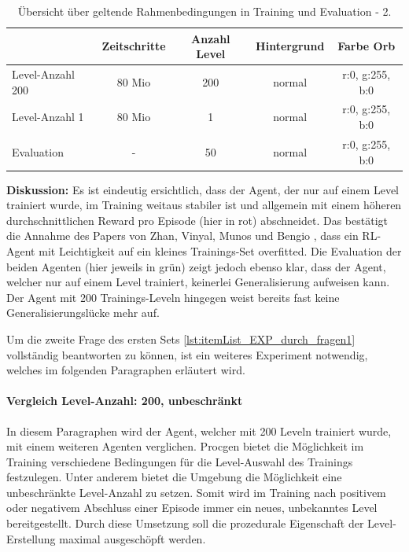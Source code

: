 \begin{center}
 \begin{table}[htb!]
 \begin{center}
  \begin{tabular}{ l c c c c }
    \hline
			       	& Zeitschritte 	& Anzahl Level 	& Hintergrund 	& Farbe Orb \\ \hline \hline
     Level-Anzahl 200 	& 80 Mio       	& 200		& 	    normal 	& r:0, g:255, b:0 \\ \hline
     Level-Anzahl 1     	& 80 Mio       	& 1			& 	    normal 	& r:0, g:255, b:0 \\ \hline
     Evaluation 		& - 	           	& 50			& 	    normal 	& r:0, g:255, b:0 \\ \hline
    \hline
  \end{tabular}
  \caption{Übersicht über geltende Rahmenbedingungen in Training und Evaluation - 2.}
  \label{tab:tab_durch_EXP_trainSetting2}
  \end{center}
 \end{table}
\end{center} 

\textbf{Diskussion:} Es ist eindeutig ersichtlich, dass der Agent, der nur auf einem Level trainiert wurde, im Training weitaus stabiler ist und allgemein mit einem höheren durchschnittlichen Reward pro Episode (hier in rot) abschneidet. Das bestätigt die Annahme des Papers von Zhan, Vinyal, Munos und Bengio \cite{zhang2018study}, dass ein RL-Agent mit Leichtigkeit auf ein kleines Trainings-Set overfitted. Die Evaluation der beiden Agenten (hier jeweils in grün) zeigt jedoch ebenso klar, dass der Agent, welcher nur auf einem Level trainiert, keinerlei Generalisierung aufweisen kann. Der Agent mit 200 Trainings-Leveln hingegen weist bereits fast keine Generalisierungslücke mehr auf. 

Um die zweite Frage des ersten Sets \ref{lst:itemList_EXP_durch_fragen1} vollständig beantworten zu können, ist ein weiteres Experiment notwendig, welches im folgenden Paragraphen erläutert wird. 


\paragraph{Vergleich Level-Anzahl: 200, unbeschränkt}\label{par:durch_EXP_vgl_200_unbeschr}
In diesem Paragraphen wird der Agent, welcher mit 200 Leveln trainiert wurde, mit einem weiteren Agenten verglichen. Procgen bietet die Möglichkeit im Training verschiedene Bedingungen für die Level-Auswahl des Trainings festzulegen. Unter anderem bietet die Umgebung die Möglichkeit eine unbeschränkte Level-Anzahl zu setzen. Somit wird im Training nach positivem oder negativem Abschluss einer Episode immer ein neues, unbekanntes Level bereitgestellt. Durch diese Umsetzung soll die prozedurale Eigenschaft der Level-Erstellung maximal ausgeschöpft werden.


